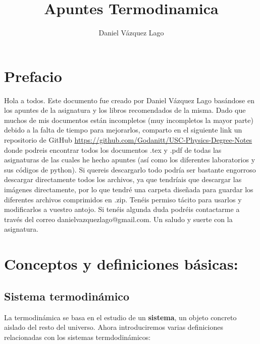 \documentclass[12pt,a4paper]{article}
\author{Daniel Vázquez Lago}
\title{Apuntes Termodinamica}
\begin{document}
\maketitle

\newpage

\tableofcontents

\newpage

\section*{Prefacio}

Hola a todos. Este documento fue creado por Daniel Vázquez Lago basándose en los apuntes de la asignatura y los libros recomendados de la misma. Dado que muchos de mis documentos están incompletos (muy incompletos la mayor parte) debido a la falta de tiempo para mejorarlos, comparto en el siguiente link un repositorio de GitHub \url{https://github.com/Godanitt/USC-Physics-Degree-Notes} donde podreis encontrar todos los documentos .tex y .pdf de todas las asignaturas de las cuales he hecho apuntes (así como los diferentes laboratorios y sus códigos de python). Si quereis descargarlo todo podría ser bastante engorroso descargar directamente todos los archivos, ya que tendríais que descargar las imágenes directamente, por lo que tendré una carpeta diseñada para guardar los diferentes archivos comprimidos en .zip. Tenéis permiso tácito para usarlos y modificarlos a vuestro antojo. Si tenéis algunda duda podréis contactarme a través del correo danielvazquezlago@gmail.com. Un saludo y suerte con la asignatura.

\newpage

\section{Conceptos y definiciones básicas:}

\subsection{Sistema termodinámico}


La termodinámica se basa en el estudio de un \textbf{sistema}, un objeto concreto aislado del resto del universo. Ahora introduciremos varias definiciones relacionadas con los sistemas termdodinámicos:
\end{document}
